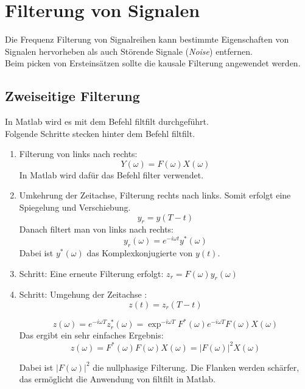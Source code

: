 \chapter{Filterung von Signalen}
Die Frequenz Filterung von Signalreihen kann bestimmte Eigenschaften von Signalen hervorheben als auch Störende Signale (\textit{Noise}) entfernen.\\
Beim picken von Ersteinsätzen sollte die kausale Filterung angewendet werden.

\section{Zweiseitige Filterung} 
In Matlab wird es mit dem Befehl filtfilt durchgeführt.\\
Folgende Schritte stecken hinter dem Befehl filtfilt.
\begin{enumerate}
\item Filterung von links nach rechts:
\begin{equation}
Y(\omega) = F(\omega)X(\omega)
\end{equation}
In Matlab wird dafür das Befehl filter verwendet. \\
\item Umkehrung der Zeitachse, Filterung rechts nach links. Somit erfolgt eine Spiegelung und Verschiebung.
\begin{equation}
y_{r} = y(T-t)
\end{equation}
Danach filtert man von links nach rechts:
\begin{equation}
y_{r}(\omega) = e^{-i\omega t} y^*(\omega) 
\end{equation}
Dabei ist $y^*(\omega)$ das Komplexkonjugierte von $y(t)$.\\
\item Schritt: Eine erneute Filterung erfolgt: $z_{r}= F(\omega)y_{r}(\omega)$\\
\item Schritt: Umgehung der Zeitachse :
\begin{equation}
z(t)=z_{r}(T-t)
\end{equation}

\begin{equation}
z(\omega)=e^{-i\omega T}z_{r}^*(\omega) = \exp^{-i\omega T} F^*(\omega) e^{-i\omega T} F(\omega)X(\omega)
\end{equation}
Das ergibt ein sehr einfaches Ergebnis:
\begin{equation}
z(\omega)=   F^*(\omega) F(\omega)X(\omega) = \vert F(\omega) \vert^2 X(\omega)
\end{equation}

Dabei ist $\vert F(\omega) \vert^2$  die nullphasige Filterung. Die Flanken werden schärfer, das ermöglicht die Anwendung von filtfilt in Matlab.
\end{enumerate}


